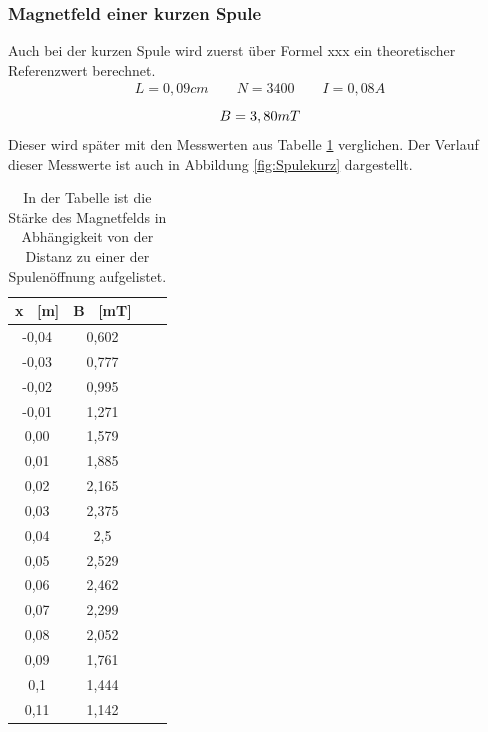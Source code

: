 \documentclass[titlepage = firstcover]{scrartcl}
\begin{document}
            \FloatBarrier
            \newpage


        \subsubsection{Magnetfeld einer kurzen Spule}
            Auch bei der kurzen Spule wird zuerst über Formel xxx ein theoretischer Referenzwert berechnet.
            \begin{align*}
                L = 0,09cm \qquad N = 3400 \qquad I = 0,08A 
            \end{align*}
            \begin{equation}
                B = 3,80 mT \\
                \label{eqn:Bkurz}
            \end{equation} 
            Dieser wird später mit den Messwerten aus Tabelle \ref{tab:Spulekurz} verglichen. Der Verlauf dieser Messwerte ist auch in Abbildung 
            \ref{fig:Spulekurz} dargestellt.
            \begin{table}[h]
                \centering 
                \caption{In der Tabelle ist die Stärke des Magnetfelds in Abhängigkeit von der Distanz zu einer der Spulenöffnung aufgelistet.}
                \label{tab:Spulekurz}

                \begin{tabular}{c c c c}
                    \toprule
                    {x \ [m]} & {B \ [mT]} \\
                    \midrule
                    -0,04 & 0,602 \\
                    -0,03 & 0,777 \\
                    -0,02 & 0,995 \\
                    -0,01 & 1,271 \\
                     0,00 & 1,579 \\
                     0,01 & 1,885 \\
                     0,02 & 2,165 \\
                     0,03 & 2,375 \\
                     0,04 & 2,5   \\
                     0,05 & 2,529 \\
                     0,06 & 2,462 \\
                     0,07 & 2,299 \\
                     0,08 & 2,052 \\
                     0,09 & 1,761 \\
                     0,1  & 1,444 \\
                     0,11 & 1,142 \\
                    \bottomrule
                \end{tabular}                
            \end{table}
\end{document}
